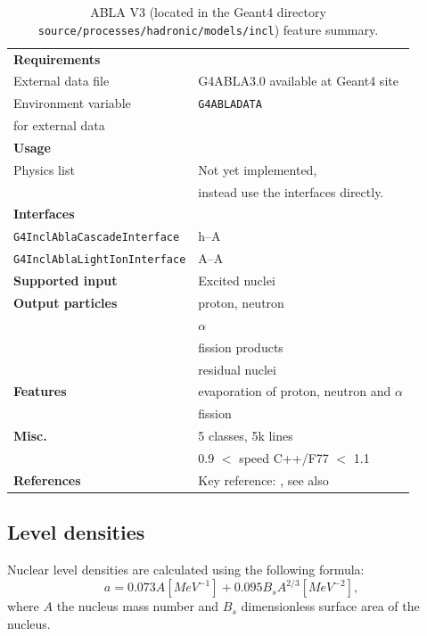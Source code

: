 \begin{table}[ht]
  \caption{ABLA V3 (located in the Geant4 directory
    {\tt source/\-processes/\-hadronic/\-models/\-incl}) feature summary.}
\label{tbl:ablasummary}
\vskip1cm
\begin{center}
\begin{tabular}{l|l}
\hline
{\bf Requirements} & \\
External data file & G4ABLA3.0 available at Geant4 site \\
Environment variable & {\tt G4ABLADATA} \\ 
for external data & \\
\hline
{\bf Usage}      & \\
Physics list     & Not yet implemented, \\
                 & instead use the interfaces directly. \\
\hline
{\bf Interfaces} &     \\
{\tt G4InclAblaCascadeInterface} &  h--A \\
{\tt G4InclAblaLightIonInterface} &  A--A \\
\hline
{\bf Supported input}     & Excited nuclei \\
\hline
{\bf Output particles}    & proton, neutron \\
                    & $\alpha$ \\
                    & fission products \\
                    & residual nuclei \\
\hline
{\bf Features} & evaporation of proton, neutron and $\alpha$ \\
                    & fission \\
\hline
{\bf Misc.}                & 5 classes, 5k lines \\
                    & 0.9 $<$ speed C++/F77 $<$ 1.1 \\
\hline
{\bf References}    & Key reference: \cite{Junghans98a}, see also \cite{Benlliure98a} \\
\hline
\end{tabular}
\end{center}
\end{table}

\subsection{Level densities}

Nuclear level densities are calculated using the following formula:
\begin{equation}
  a = 0.073 A  [MeV^{-1}] + 0.095  B_s  A^{2/3} [MeV^{-2}],
\label{eqn:leveldensity}
\end{equation}
where $A$ the nucleus mass number and $B_s$ dimensionless surface area
of the nucleus. 

